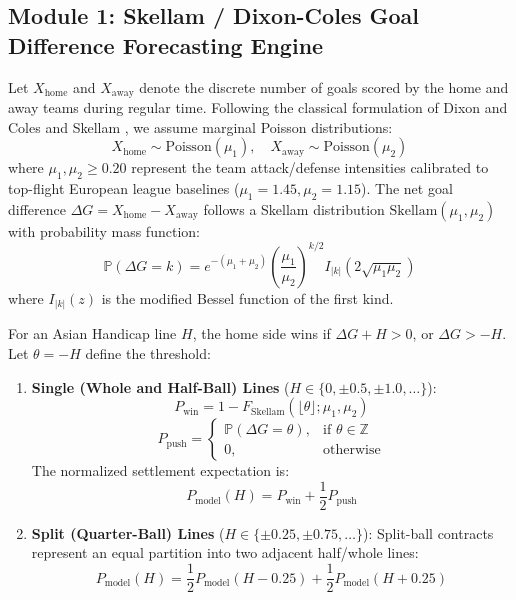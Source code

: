 \documentclass[10pt,twocolumn]{article}
\begin{document}
\subsection{Module 1: Skellam / Dixon-Coles Goal Difference Forecasting Engine}

Let $X_{\text{home}}$ and $X_{\text{away}}$ denote the discrete number of goals scored by the home and away teams during regular time. Following the classical formulation of Dixon and Coles \cite{12} and Skellam \cite{13}, we assume marginal Poisson distributions:
\begin{equation}
X_{\text{home}} \sim \text{Poisson}(\mu_1), \quad X_{\text{away}} \sim \text{Poisson}(\mu_2)
\end{equation}
where $\mu_1, \mu_2 \ge 0.20$ represent the team attack/defense intensities calibrated to top-flight European league baselines ($\mu_1 = 1.45, \mu_2 = 1.15$). The net goal difference $\Delta G = X_{\text{home}} - X_{\text{away}}$ follows a Skellam distribution $\text{Skellam}(\mu_1, \mu_2)$ with probability mass function:
\begin{equation}
\mathbb{P}(\Delta G = k) = e^{-(\mu_1 + \mu_2)} \left(\frac{\mu_1}{\mu_2}\right)^{k/2} I_{|k|}\left(2\sqrt{\mu_1 \mu_2}\right)
\end{equation}
where $I_{|k|}(z)$ is the modified Bessel function of the first kind.

For an Asian Handicap line $H$, the home side wins if $\Delta G + H > 0$, or $\Delta G > -H$. Let $\theta = -H$ define the threshold:
\begin{enumerate}
    \item \textbf{Single (Whole and Half-Ball) Lines} ($H \in \{0, \pm 0.5, \pm 1.0, \dots\}$):
    \begin{equation}
    P_{\text{win}} = 1 - F_{\text{Skellam}}(\lfloor \theta \rfloor; \mu_1, \mu_2)
    \end{equation}
    \begin{equation}
    P_{\text{push}} = \begin{cases}
    \mathbb{P}(\Delta G = \theta), & \text{if } \theta \in \mathbb{Z} \\
    0, & \text{otherwise}
    \end{cases}
    \end{equation}
    The normalized settlement expectation is:
    \begin{equation}
    P_{\text{model}}(H) = P_{\text{win}} + \frac{1}{2} P_{\text{push}}
    \end{equation}
    \item \textbf{Split (Quarter-Ball) Lines} ($H \in \{\pm 0.25, \pm 0.75, \dots\}$):
    Split-ball contracts represent an equal partition into two adjacent half/whole lines:
    \begin{equation}
    P_{\text{model}}(H) = \frac{1}{2} P_{\text{model}}(H - 0.25) + \frac{1}{2} P_{\text{model}}(H + 0.25)
    \end{equation}
\end{enumerate}
\end{document}
